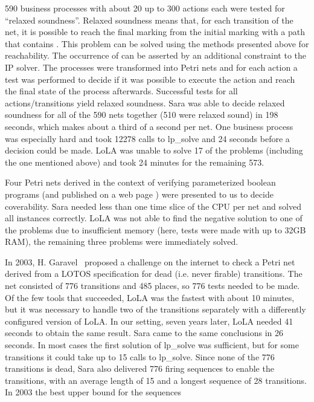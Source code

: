 \documentclass{LMCS}
\begin{document}
\begin{iteMize}{}
\item 590 business processes with about 20 up to 300 actions each were tested for ``relaxed
soundness''. Relaxed soundness means that, for each transition  of the net, it is possible to reach the final marking from the initial marking with a path that contains . 
This problem can be solved using the methods presented above for reachability. The occurrence of  can be asserted by an additional constraint  to the IP solver.
The processes were transformed into Petri nets and for each action a test was performed
to decide if it was possible to execute the action and reach the final state of the process afterwards.
Successful tests for all actions/transitions yield relaxed soundness.
Sara was able to decide relaxed soundness for all of the 590 nets together (510 were relaxed sound)
in 198 seconds, which makes
about a third of a second per net. One business process was especially hard and took 12278 calls
to lp\_solve and 24 seconds before a decision could be made. LoLA was unable to solve 17
of the problems (including the one mentioned above) and took 24 minutes for the remaining 573. 
\item Four Petri nets derived in the context of verifying parameterized boolean programs (and published on a web page \cite{wsts}) were presented to us to decide coverability.
Sara needed less than one time slice of the CPU per net and solved all instances correctly.
LoLA was not able to find the negative solution to one of the problems due to insufficient memory (here, tests were made with up to 32GB RAM),
the remaining three problems were immediately solved.
\item In 2003, H. Garavel~\cite{garavel03} proposed a challenge on the internet to check a Petri net derived from
a LOTOS specification for dead (i.e. never firable) transitions. The net consisted of 776 transitions
and 485 places, so 776 tests needed to be made. Of the few tools that succeeded, LoLA was the fastest
with about 10 minutes, but it was necessary to handle two of the transitions separately with a differently
configured version of LoLA. In our setting, seven years later, LoLA needed 41 seconds to obtain the
same result. Sara came to the same conclusions in 26 seconds. In most cases the first solution of
lp\_solve was sufficient, but for some transitions it could take up to 15 calls
to lp\_solve. Since none of the 776 transitions is dead,
Sara also delivered 776 firing sequences to enable the transitions, with an average length of
15 and a longest sequence of 28 transitions. In 2003 the best upper bound for the sequences

\end{iteMize}
\end{document}
